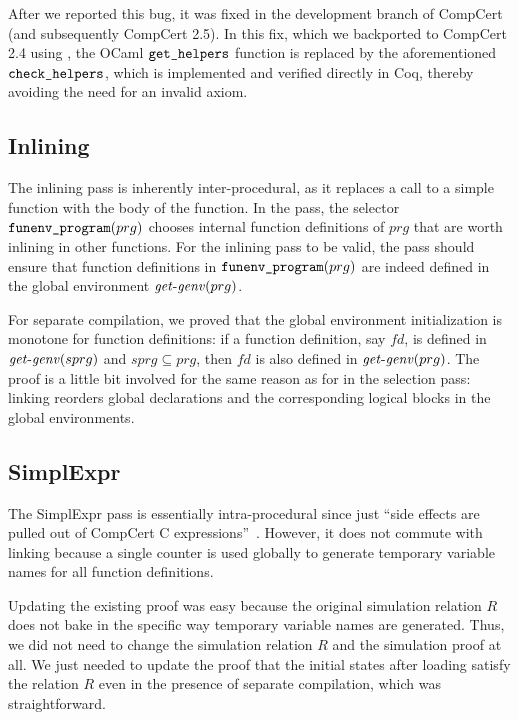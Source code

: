After we reported this bug, it was fixed in the development branch of
CompCert (and subsequently CompCert 2.5). In this fix, which we
backported to CompCert 2.4 using , the OCaml
$\texttt{get\_helpers}$ function is replaced by the aforementioned
$\texttt{check\_helpers}$, which is implemented and verified directly
in Coq, thereby avoiding the need for an invalid axiom.

\subsection{Inlining}
The inlining pass is inherently inter-procedural, as it replaces a
call to a simple function with the body of the function.  In the pass,
the selector $\texttt{funenv\_program}(prg)$ chooses internal function
definitions of $prg$ that are worth inlining in other functions.  For
the inlining pass to be valid, the pass should ensure that function
definitions in $\texttt{funenv\_program}(prg)$ are indeed defined in
the global environment $\mathit{get\text{-}genv}(prg)$.

For separate compilation, we proved that the global environment
initialization is monotone for function definitions: if a function
definition, say $fd$, is defined in $\mathit{get\text{-}genv}(sprg)$ and $sprg
\subseteq prg$, then $fd$ is also defined in $\mathit{get\text{-}genv}(prg)$.  The
proof is a little bit involved for the same reason as for
 in the selection pass: linking reorders global
declarations and the corresponding logical blocks in the global
environments.


\subsection{SimplExpr}
The SimplExpr pass is essentially intra-procedural since just ``side
effects are pulled out of CompCert C expressions''~\cite{compcert-website}.
However, it does not commute with linking because a single counter is
used globally to generate temporary variable names for all function
definitions.

Updating the existing proof was easy because the original simulation
relation $R$ does not bake in the specific way temporary variable
names are generated. Thus, we did not need to change the simulation
relation $R$ and the simulation proof at all.  We just needed to
update the proof that the initial states after loading satisfy the
relation $R$ even in the presence of separate compilation, which
was straightforward.



